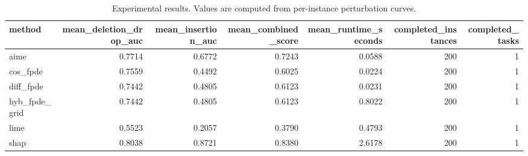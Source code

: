 \begin{table}[t]
\caption{Experimental results. Values are computed from per-instance perturbation curves.}
\label{tab:main_results_computed}
\centering
\begin{tabular}{lrrrrrr}
\toprule
method & mean\_deletion\_drop\_auc & mean\_insertion\_auc & mean\_combined\_score & mean\_runtime\_seconds & completed\_instances & completed\_tasks \\
\midrule
aime & 0.7714 & 0.6772 & 0.7243 & 0.0588 & 200 & 1 \\
cos\_fpde & 0.7559 & 0.4492 & 0.6025 & 0.0224 & 200 & 1 \\
diff\_fpde & 0.7442 & 0.4805 & 0.6123 & 0.0231 & 200 & 1 \\
hyb\_fpde\_grid & 0.7442 & 0.4805 & 0.6123 & 0.8022 & 200 & 1 \\
lime & 0.5523 & 0.2057 & 0.3790 & 0.4793 & 200 & 1 \\
shap & 0.8038 & 0.8721 & 0.8380 & 2.6178 & 200 & 1 \\
\bottomrule
\end{tabular}

\end{table}
